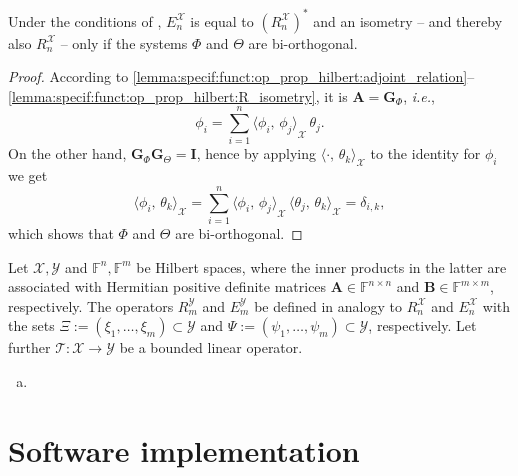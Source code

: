 \documentclass[a4paper]{paper}
\newcommand{\Spc}[1]{\mathscr{#1}}
\newcommand{\Field}{\mathbb{F}}
\newcommand{\Op}[1]{\mathcal{#1}}
\newcommand*{\EXT}[2]{\ensuremath{E_{#1}^{#2}}}
\newcommand*{\REST}[2]{\ensuremath{R_{#1}^{#2}}}
\newcommand*{\RnX}{\ensuremath{\REST{n}{\Spc{X}}}}
\newcommand*{\RmY}{\ensuremath{\REST{m}{\Spc{Y}}}}
\newcommand*{\EnX}{\ensuremath{\EXT{n}{\Spc{X}}}}
\newcommand*{\EmY}{\ensuremath{\EXT{m}{\Spc{Y}}}}
\newcommand*{\INNER}[2]{\ensuremath{\langle #1,\,#2\rangle}}
\newcommand{\ie}{\textsl{i.e.}\xspace}
\newcommand{\vA}{\boldsymbol{A}}
\newcommand{\vB}{\boldsymbol{B}}
\newcommand{\vG}{\boldsymbol{G}}
\newcommand{\vI}{\boldsymbol{I}}
\begin{document}
\begin{corollary} 
 Under the conditions of , $\EnX$ is equal to $(\RnX)^*$ and 
 an isometry -- and thereby also $\RnX$ -- only if the systems $\Phi$ and $\Theta$ are bi-orthogonal.
\end{corollary}
\vspace{1em}


\begin{proof}
 According to 
 \eqref{lemma:specif:funct:op_prop_hilbert:adjoint_relation}--\eqref{lemma:specif:funct:op_prop_hilbert:R_isometry},
 it is $\vA = \vG_\Phi$, \ie,
 \begin{equation*}
  \phi_i = \sum_{i=1}^n \INNER{\phi_i}{\phi_j}_{\Spc{X}}\, \theta_j.
 \end{equation*}
 On the other hand, $\vG_\Phi \vG_\Theta = \vI$, hence by applying $\INNER{\cdot}{\theta_k}_{\Spc{X}}$ to the identity 
 for $\phi_i$ we get
 \begin{equation*}
  \INNER{\phi_i}{\theta_k}_{\Spc{X}} 
  = \sum_{i=1}^n \INNER{\phi_i}{\phi_j}_{\Spc{X}}\, \INNER{\theta_j}{\theta_k}_{\Spc{X}}
  = \delta_{i,k},
 \end{equation*}
 which shows that $\Phi$ and $\Theta$ are bi-orthogonal.
\end{proof}


\begin{lemma}
 \label{lemma:specif:funct:op_prop_hilbert_mapping}
 Let $\Spc{X}, \Spc{Y}$ and $\Field^n, \Field^m$ be Hilbert spaces, where the inner products in the latter are 
 associated with Hermitian positive definite matrices $\vA \in \Field^{n\times n}$ and $\vB \in \Field^{m\times m}$, 
 respectively. The operators $\RmY$ and $\EmY$ be defined in analogy to $\RnX$ and $\EnX$ with the sets 
 $\Xi := (\xi_1, \ldots, \xi_m) \subset \Spc{Y}$ and $\Psi := (\psi_1, \ldots, \psi_m) \subset \Spc{Y}$, 
 respectively. Let further $\Op{T}\colon \Spc{X} \to \Spc{Y}$ be a bounded linear operator. 
 
 \begin{enumerate}[(a)]
  \item 
 \end{enumerate}

\end{lemma}

\section{Software implementation}
\label{sec:soft}
\end{document}
